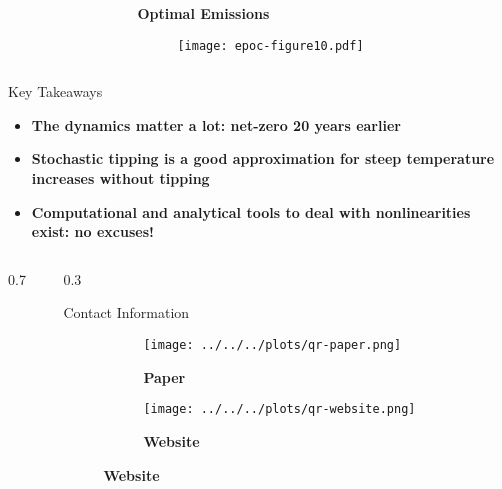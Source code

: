 \documentclass[final]{beamer}
\newlength{\onecolwid}
\newlength{\twocolwid}
\begin{document}
\begin{frame}[t]
\begin{columns}[t]
\begin{column}{\twocolwid}
\begin{columns}
\begin{column}{\onecolwid}
    \end{column}
    \begin{column}{\onecolwid}
        \textbf{\large Optimal Emissions} \vspace{1em} 
        \begin{figure}
            \texttt{[image: epoc-figure10.pdf]}
        \end{figure}
    \end{column}
\end{columns}

\begin{alertblock}{Key Takeaways}
    \begin{itemize} \setlength\itemsep{0.5em}
        \item \textbf{The dynamics matter a lot: net-zero 20 years earlier}
        \item \textbf{Stochastic tipping is a good approximation for steep temperature increases without tipping}
        \item \textbf{Computational and analytical tools to deal with nonlinearities exist: no excuses!}
    \end{itemize}
\end{alertblock}

\begin{columns}
\begin{column}{0.7\twocolwid}
    \renewcommand*{\bibfont}{\footnotesize}
    \printbibliography
\end{column}
\begin{column}{0.3\twocolwid}
    \begin{alertblock}{Contact Information}
        \begin{figure}
            \captionsetup{labelformat=empty}
            \begin{subfigure}{0.45\textwidth}
                \centering
                \captionsetup{labelformat=empty}
                \texttt{[image: ../../../plots/qr-paper.png]}
                \caption{\textbf{Paper}}
            \end{subfigure}
            \begin{subfigure}{0.45\textwidth}
                \centering
                \captionsetup{labelformat=empty}
                \texttt{[image: ../../../plots/qr-website.png]}
                \caption{\textbf{Website}}
            \end{subfigure}  
        \end{figure}
    \end{alertblock}
\end{column}
\end{columns}

\end{column}  %
\end{columns} %

\end{frame} %
\end{document}

